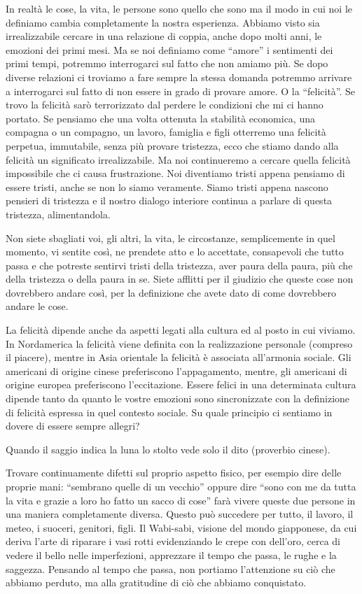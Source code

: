 \documentclass[12pt]{book} %
\begin{document}
In realtà le cose, la vita, le persone sono quello che sono ma il modo in cui noi le definiamo cambia completamente la
nostra esperienza. Abbiamo visto sia irrealizzabile cercare in una relazione di coppia, anche dopo molti anni, le
emozioni dei primi mesi. Ma se noi definiamo come “amore” i sentimenti dei primi tempi, potremmo interrogarci sul fatto
che non amiamo più. Se dopo diverse relazioni ci troviamo a fare sempre la stessa domanda potremmo arrivare a
interrogarci sul fatto di non essere in grado di provare amore. O la “felicità”. Se trovo la felicità sarò terrorizzato
dal perdere le condizioni che mi ci hanno portato. Se pensiamo che una volta ottenuta la stabilità economica, una
compagna o un compagno, un lavoro, famiglia e figli otterremo una felicità perpetua, immutabile, senza più provare
tristezza, ecco che stiamo dando alla felicità un significato irrealizzabile. Ma noi continueremo a cercare quella
felicità impossibile che ci causa frustrazione. Noi diventiamo tristi appena pensiamo di essere tristi, anche se non lo
siamo veramente. Siamo tristi appena nascono pensieri di tristezza e il nostro dialogo interiore continua a parlare di
questa tristezza, alimentandola.

Non siete sbagliati voi, gli altri, la vita, le circostanze, semplicemente in quel momento, vi sentite così, ne prendete
atto e lo accettate, consapevoli che tutto passa e che potreste sentirvi tristi della tristezza, aver paura della
paura, più che della tristezza o della paura in se. Siete afflitti per il giudizio che queste cose non dovrebbero
andare così, per la definizione che avete dato di come dovrebbero andare le cose. 

La felicità dipende anche da aspetti legati alla cultura ed al posto in cui viviamo. In Nordamerica la felicità viene
definita con la realizzazione personale (compreso il piacere), mentre in Asia orientale la felicità è associata
all'armonia sociale. Gli americani di origine cinese preferiscono
l'appagamento, mentre, gli americani di origine europea preferiscono
l'eccitazione.
Essere felici in una determinata cultura dipende tanto da quanto le vostre emozioni sono sincronizzate con la
definizione di felicità espressa in quel contesto sociale. 
Su quale principio ci sentiamo in dovere di essere sempre allegri?

Quando il saggio indica la luna lo stolto vede solo il dito (proverbio cinese). 

Trovare continuamente difetti sul proprio aspetto fisico, per esempio dire delle proprie mani: “sembrano quelle di un
vecchio” oppure dire “sono con me da tutta la vita e grazie a loro ho fatto un sacco di cose” farà vivere queste due
persone in una maniera completamente diversa. Questo può succedere per tutto, il lavoro, il meteo, i suoceri, genitori,
figli. Il Wabi-sabi, visione del mondo giapponese, da cui deriva l'arte di riparare i vasi rotti evidenziando le crepe con dell'oro,
cerca di vedere il bello nelle imperfezioni, apprezzare il tempo che passa, le
rughe e la saggezza. Pensando al tempo che passa, non portiamo l'attenzione su ciò che abbiamo perduto, ma alla gratitudine di ciò che abbiamo conquistato.
\end{document}
